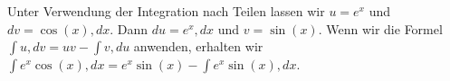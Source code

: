 Unter Verwendung der Integration nach Teilen lassen wir $u = e^x$ und $dv = \cos(x), dx$.
Dann $du = e^x, dx$ und $v = \sin(x)$.
Wenn wir die Formel $\int u, dv = uv - \int v, du$ anwenden, erhalten wir $\int e^x \cos(x), dx = e^x \sin(x) - \int e^x \sin(x), dx$.
